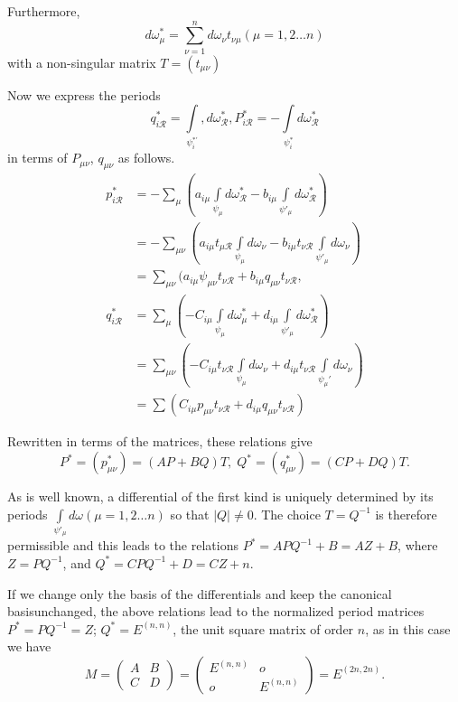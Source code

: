 Furthermore,
$$
d\omega^*_{\mu} = \sum^n_{\nu = 1} d\omega_\nu t_{\nu \mu} (\mu =
1,2 \ldots n) 
$$
with a non-singular matrix $T = (t_{\mu \nu})$

Now we express the periods
$$
q^*_{i\mathscr{R}} = \int\limits_{\psi^{*'}_i},
d\omega^*_{\mathscr{R}},   P^*_{i\mathscr{R}} = -
\int\limits_{\psi^*_i} d\omega^*_{\mathscr{R}}
$$
in terms of $P_{\mu \nu}$, $q_{\mu \nu}$ as follows.
\begin{align*}
p^*_{i\mathscr{R}} & =  - \sum_{\mu} (a_{i\mu}
\int\limits_{\psi_\mu}  d\omega^*_{\mathscr{R}} - b_{i\mu}
\int\limits_{\psi'_\mu} d\omega^*_{\mathscr{R}})\\ 
& = - \sum_{\mu\nu}   (a_{i\mu}   t_{\mu\mathscr{R}}
\int\limits_{\psi_\mu} d\omega_\nu - b_{i\mu}   t_{\nu
  \mathscr{R}} \int\limits_{\psi'_\mu} d\omega_\nu )\\ 
& = \sum_{\mu \nu}   (a_{i\mu}   \psi_{\mu \nu}   t_{\nu
  \mathscr{R}} + b_{i \mu}   q_{\mu \nu}   t_{\nu\mathscr{R}},\\ 
q^*_{i\mathscr{R}} & = \sum_\mu   (-C_{i\mu}
\int\limits_{\psi_\mu}   d\omega^*_{\mu} + d_{i\mu}  
\int\limits_{\psi'_\mu}   d\omega^*_{\mathscr{R}})\\ 
& = \sum_{\mu\nu}   (-C_{i\mu}   t_{\nu \mathscr{R}}  
\int\limits_{\psi_{\mu}}   d\omega_\nu + d_{i\mu}   t_{\nu
  \mathscr{R}} \int\limits_{\psi_\mu'}  d\omega_\nu )\\ 
& = \sum   (C_{i\mu}  p_{\mu \nu}   t_{\nu \mathscr{R}} + d_{i\mu}  
q_{\mu \nu}   t_{\nu \mathscr{R}}) 
\end{align*}

Rewritten in terms of the matrices, these relations give
$$
P^* = (p^*_{\mu \nu}) = (AP + BQ) T, \; Q^* = (q^*_{\mu \nu}) = (CP +
DQ) T. 
$$

As is well known, a differential of the first kind is uniquely
determined by its periods $\int\limits_{\psi'_\mu}   d\omega    (\mu =
1,2 \ldots n)$ so that $| Q | \neq 0$. The choice $T = Q^{-1}$ is
therefore permissible and this leads to the relations $P^* = APQ^{-1}
+ B = AZ + B$, where $Z = PQ^{-1}$, and $Q^* = CPQ^{-1} + D = CZ +n$. 

If we change only the basis of the differentials and keep the
canonical basis\pageoriginale unchanged, the above relations lead to
the normalized 
period matrices $P^* = PQ^{-1} = Z$; $Q^* = E^{(n, n)}$, the unit
square matrix of order $n$, as in this case we have 
$$
M =\begin{pmatrix} 
A & B \\ 
C & D
 \end{pmatrix} 
= \begin{pmatrix}
  E^{(n,n)} & o\\
 o & E^{(n,n)}
 \end{pmatrix} 
= E^{(2n,2n)}. 
$$

